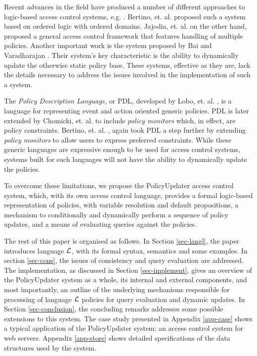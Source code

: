\documentclass[11pt, twocolumn]{article}
\begin{document}
    Recent advances in the field have produced a number of different approaches
    to logic-based access control systems, e.g. \cite{HAL,LI}. Bertino, et. al.
    \cite{BE1} proposed such a system based on ordered logic with ordered
    domains. Jajodia, et. al. \cite{JAJ} on the other hand, proposed a general
    access control framework that features handling of multiple policies.
    Another important work is the system proposed by Bai and Varadharajan
    \cite{BA1,BA2}. Their system's key characteristic is the ability to
    dynamically update the otherwise static policy base. These systems,
    effective as they are, lack the details necessary to address the issues
    involved in the implementation of such a system.

    The {\em Policy Description Language}, or PDL, developed by Lobo,
    et. al. \cite{LOB}, is a language for representing event and action
    oriented generic policies. PDL is later extended by Chomicki, et. al.
    \cite{CHO} to include {\em policy monitors} which, in effect, are policy
    constraints. Bertino, et. al. \cite{BE2}, again took PDL a step further by
    extending {\em policy monitors} to allow users to express preferred
    constraints. While these generic languages are expressive enough to be used
    for access control systems, systems built for such languages will not have
    the ability to dynamically update the policies.

    To overcome these limitations, we propose the PolicyUpdater access control
    system, which, with its own access control language, provides a formal
    logic-based representation of policies, with variable resolution and
    default propositions, a mechanism to conditionally and dynamically
    perform a sequence of policy updates, and a means of evaluating queries
    against the policies.

    The rest of this paper is organised as follows. In Section \ref{sec-langl},
    the paper introduces language ${\cal L}$, with its formal syntax, semantics
    and some examples. In section \ref{sec-cons}, the issues of consistency and
    query evaluation are addressed. The implementation, as discussed in Section
    \ref{sec-implement}, gives an overview of the PolicyUpdater system as
    a whole, its internal and external components, and most importantly, an
    outline of the underlying mechanisms responsible for processing of language
    ${\cal L}$ policies for query evaluation and dynamic updates. In Section
    \ref{sec-conclusion}, the concluding remarks addresses some possible
    extensions to this system. The case study presented in Appendix
    \ref{app-case} shows a typical application of the PolicyUpdater system: an
    access control system for web servers. Appendix \ref{app-store} shows
    detailed specifications of the data structures used by the system.
\end{document}
